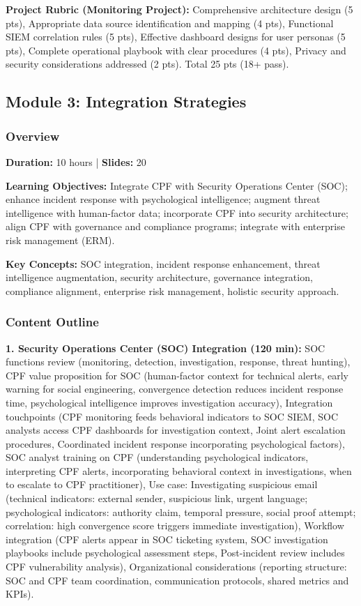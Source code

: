 \documentclass[11pt,a4paper]{article}
\begin{document}
\textbf{Project Rubric (Monitoring Project):} Comprehensive architecture design (5 pts), Appropriate data source identification and mapping (4 pts), Functional SIEM correlation rules (5 pts), Effective dashboard designs for user personas (5 pts), Complete operational playbook with clear procedures (4 pts), Privacy and security considerations addressed (2 pts). Total 25 pts (18+ pass).

\subsection{Module 3: Integration Strategies}

\subsubsection{Overview}

\textbf{Duration:} 10 hours | \textbf{Slides:} 20

\textbf{Learning Objectives:} Integrate CPF with Security Operations Center (SOC); enhance incident response with psychological intelligence; augment threat intelligence with human-factor data; incorporate CPF into security architecture; align CPF with governance and compliance programs; integrate with enterprise risk management (ERM).

\textbf{Key Concepts:} SOC integration, incident response enhancement, threat intelligence augmentation, security architecture, governance integration, compliance alignment, enterprise risk management, holistic security approach.

\subsubsection{Content Outline}

\textbf{1. Security Operations Center (SOC) Integration (120 min):} SOC functions review (monitoring, detection, investigation, response, threat hunting), CPF value proposition for SOC (human-factor context for technical alerts, early warning for social engineering, convergence detection reduces incident response time, psychological intelligence improves investigation accuracy), Integration touchpoints (CPF monitoring feeds behavioral indicators to SOC SIEM, SOC analysts access CPF dashboards for investigation context, Joint alert escalation procedures, Coordinated incident response incorporating psychological factors), SOC analyst training on CPF (understanding psychological indicators, interpreting CPF alerts, incorporating behavioral context in investigations, when to escalate to CPF practitioner), Use case: Investigating suspicious email (technical indicators: external sender, suspicious link, urgent language; psychological indicators: authority claim, temporal pressure, social proof attempt; correlation: high convergence score triggers immediate investigation), Workflow integration (CPF alerts appear in SOC ticketing system, SOC investigation playbooks include psychological assessment steps, Post-incident review includes CPF vulnerability analysis), Organizational considerations (reporting structure: SOC and CPF team coordination, communication protocols, shared metrics and KPIs).
\end{document}
